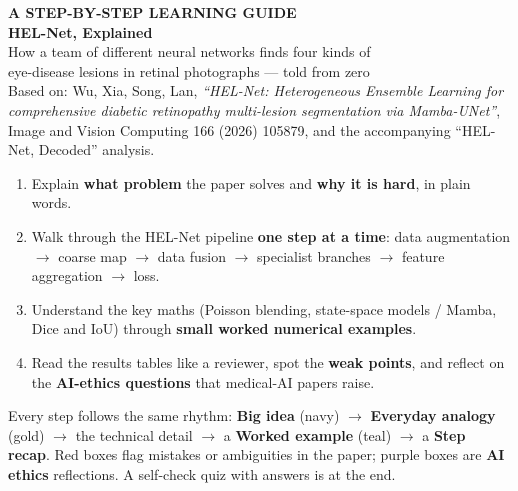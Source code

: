 \documentclass[11pt,a4paper]{article}
\begin{document}
\begin{titlepage}
\vspace*{0.4cm}
{\sffamily\bfseries\color{gold}\large A STEP-BY-STEP LEARNING GUIDE}\\[0.5cm]
{\sffamily\bfseries\color{white}\fontsize{30}{36}\selectfont HEL-Net, Explained}\\[0.4cm]
{\sffamily\color{white}\large How a team of different neural networks finds four kinds of\\[2pt]
eye-disease lesions in retinal photographs --- told from zero}\\[0.5cm]
{\sffamily\color{white}\small Based on: Wu, Xia, Song, Lan, \emph{``HEL-Net: Heterogeneous Ensemble Learning
for comprehensive diabetic retinopathy multi-lesion segmentation via Mamba-UNet''},\\
Image and Vision Computing 166 (2026) 105879, and the accompanying ``HEL-Net, Decoded'' analysis.}

\vspace{3.2cm}
\begin{idea}
\begin{enumerate}[leftmargin=*]
  \item Explain \textbf{what problem} the paper solves and \textbf{why it is hard}, in plain words.
  \item Walk through the HEL-Net pipeline \textbf{one step at a time}: data augmentation
        $\rightarrow$ coarse map $\rightarrow$ data fusion $\rightarrow$ specialist branches
        $\rightarrow$ feature aggregation $\rightarrow$ loss.
  \item Understand the key maths (Poisson blending, state-space models / Mamba, Dice and IoU)
        through \textbf{small worked numerical examples}.
  \item Read the results tables like a reviewer, spot the \textbf{weak points}, and reflect on the
        \textbf{AI-ethics questions} that medical-AI papers raise.
\end{enumerate}
\end{idea}

\begin{analogy}
Every step follows the same rhythm: \textbf{Big idea} (navy) $\rightarrow$ \textbf{Everyday analogy}
(gold) $\rightarrow$ the technical detail $\rightarrow$ a \textbf{Worked example} (teal) $\rightarrow$
a \textbf{Step recap}. Red boxes flag mistakes or ambiguities in the paper; purple boxes are
\textbf{AI ethics} reflections. A self-check quiz with answers is at the end.
\end{analogy}


\end{titlepage}
\end{document}
